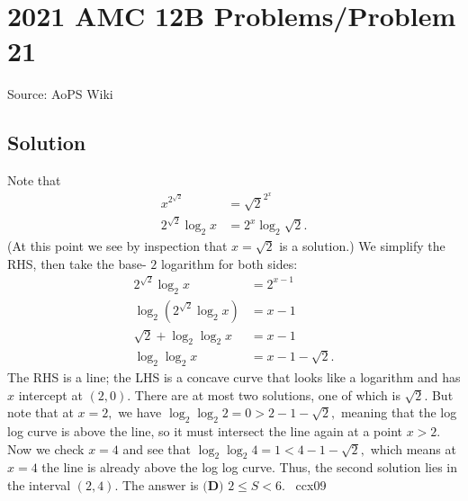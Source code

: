 \documentclass[12pt]{article}
\begin{document}
\section*{{2021 AMC 12B Problems/Problem 21}}
Source: AoPS Wiki

\subsection*{Solution}
Note that \begin{align*} x^{2^{\sqrt{2}}} &= {\sqrt{2}}^{2^x} \\ 2^{\sqrt{2}} \log_2 x &= 2^{x} \log_2 \sqrt{2}. \end{align*} (At this point we see by inspection that $x=\sqrt{2}$ is a solution.) We simplify the RHS, then take the base- $2$ logarithm for both sides: \begin{align*} 2^{\sqrt{2}} \log_2 x &= 2^{x-1} \\ \log_2{\left(2^{\sqrt{2}} \log_2 x\right)} &= x-1 \\ \sqrt{2} + \log_2 \log_2 x &= x-1 \\ \log_2 \log_2 x &= x - 1 - \sqrt{2}. \end{align*} The RHS is a line; the LHS is a concave curve that looks like a logarithm and has $x$ intercept at $(2,0).$ There are at most two solutions, one of which is $\sqrt{2}.$ But note that at $x=2,$ we have $\log_2 \log_2 {2} = 0 > 2 - 1 - \sqrt{2},$ meaning that the log log curve is above the line, so it must intersect the line again at a point $x > 2.$ Now we check $x=4$ and see that $\log_2 \log_2 {4} = 1 < 4 - 1 - \sqrt{2},$ which means at $x=4$ the line is already above the log log curve. Thus, the second solution lies in the interval $(2,4).$ The answer is $\boxed{\textbf{(D) }2\le S<6}.$ ~ccx09
\end{document}
